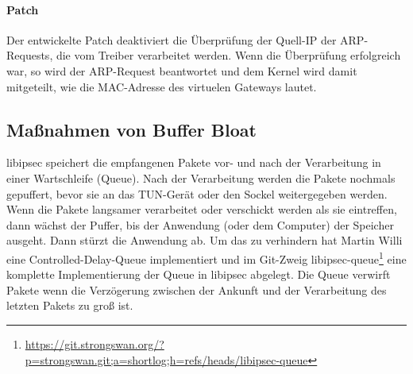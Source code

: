 \paragraph{Patch}
Der entwickelte Patch deaktiviert die Überprüfung der Quell-IP der ARP-Requests, die
vom Treiber verarbeitet werden. Wenn die Überprüfung erfolgreich war, so wird der ARP-Request
beantwortet und dem Kernel wird damit mitgeteilt, wie die MAC-Adresse des virtuelen Gateways lautet.

\subsection{Maßnahmen von Buffer Bloat}
libipsec speichert die empfangenen Pakete vor- und nach der Verarbeitung in einer Wartschleife (Queue).
Nach der Verarbeitung werden die Pakete nochmals gepuffert, bevor sie an das TUN-Gerät oder den Sockel
weitergegeben werden. Wenn die Pakete langsamer verarbeitet oder verschickt werden als sie eintreffen,
dann wächst der Puffer, bis der Anwendung (oder dem Computer) der Speicher ausgeht. Dann stürzt die Anwendung ab.
Um das zu verhindern hat Martin Willi eine Controlled-Delay-Queue implementiert und im Git-Zweig libipsec-queue\footnote{\url{https://git.strongswan.org/?p=strongswan.git;a=shortlog;h=refs/heads/libipsec-queue}} eine komplette Implementierung der Queue in libipsec abgelegt.
Die Queue verwirft Pakete wenn die Verzögerung zwischen der Ankunft und der Verarbeitung
des letzten Pakets zu groß ist.
